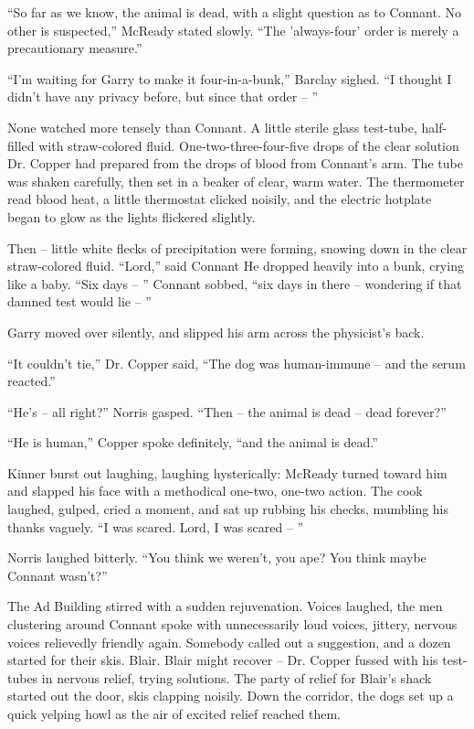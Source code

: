 \documentclass[ebook,oneside,11pt]{memoir}				%
\begin{document}
``So far as we know, the animal is dead, with a slight question as to Connant. No other is suspected,'' McReady stated slowly. ``The 'always-four' order is merely a precautionary measure.''

``I'm waiting for Garry to make it four-in-a-bunk,'' Barclay sighed. ``I thought I didn't have any privacy before, but since that order -- ''

None watched more tensely than Connant. A little sterile glass test-tube, half-filled with straw-colored fluid. One-two-three-four-five drops of the clear solution Dr. Copper had prepared from the drops of blood from Connant's arm. The tube was shaken carefully, then set in a beaker of clear, warm water. The thermometer read blood heat, a little thermostat clicked noisily, and the electric hotplate began to glow as the lights flickered slightly.

Then -- little white flecks of precipitation were forming, snowing down in the clear straw-colored fluid. ``Lord,'' said Connant He dropped heavily into a bunk, crying like a baby. ``Six days -- '' Connant sobbed, ``six days in there -- wondering if that damned test would lie -- ''

Garry moved over silently, and slipped his arm across the physicist's back.

``It couldn't tie,'' Dr. Copper said, ``The dog was human-immune -- and the serum reacted.''

``He's -- all right?'' Norris gasped. ``Then -- the animal is dead -- dead forever?''

``He is human,'' Copper spoke definitely, ``and the animal is dead.''

Kinner burst out laughing, laughing hysterically: McReady turned toward him and slapped his face with a methodical one-two, one-two action. The cook laughed, gulped, cried a moment, and sat up rubbing his checks, mumbling his thanks vaguely. ``I was scared. Lord, I was scared -- ''

Norris laughed bitterly. ``You think we weren't, you ape? You think maybe Connant wasn't?''

The Ad Building stirred with a sudden rejuvenation. Voices laughed, the men clustering around Connant spoke with unnecessarily loud voices, jittery, nervous voices relievedly friendly again. Somebody called out a suggestion, and a dozen started for their skis. Blair. Blair might recover -- Dr. Copper fussed with his test-tubes in nervous relief, trying solutions. The party of relief for Blair's shack started out the door, skis clapping noisily. Down the corridor, the dogs set up a quick yelping howl as the air of excited relief reached them.
\end{document}
